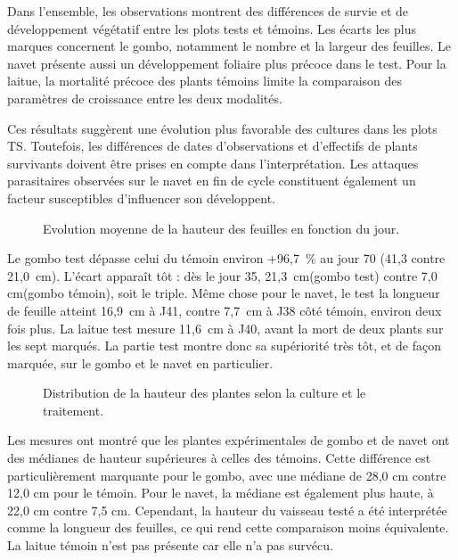 Dans l'ensemble, les observations montrent des différences de survie et de développement végétatif entre les plots tests et témoins. Les écarts les plus marques concernent le gombo, notamment le nombre et la largeur des feuilles. Le navet présente aussi un développement foliaire plus précoce dans le test. Pour la laitue, la mortalité précoce des plants témoins limite la comparaison des paramètres de croissance entre les deux modalités.

Ces résultats suggèrent une évolution plus favorable des cultures dans les plots TS. Toutefois, les différences de dates d'observations et d'effectifs de plants survivants doivent être prises en compte dans l'interprétation. Les attaques parasitaires observées sur le navet en fin de cycle constituent également un facteur susceptibles d'influencer son développent.

\begin{figure}[H]
    \centering
    \caption{Evolution moyenne de la hauteur des feuilles en fonction du jour. }
    \label{fig:hauteur-feuille5}
\end{figure}
Le gombo test dépasse celui du témoin  environ +96,7~\% au jour 70 (41{,}3 contre 21{,}0~cm). L'écart apparaît tôt : dès le jour 35,  21{,}3~cm(gombo test) contre 7{,}0 cm(gombo témoin), soit le triple. Même chose pour le navet, le test la longueur de feuille atteint 16{,}9~cm à J41, contre 7{,}7~cm à J38 côté témoin, environ deux fois plus. La laitue test mesure 11{,}6~cm à J40, avant la mort de deux plants sur les sept marqués. La  partie test montre donc sa supériorité très tôt, et de façon marquée, sur le gombo et le navet en particulier.

\begin{figure}[H]
    \centering
    \caption{Distribution de la hauteur des plantes selon la culture et le traitement. }
    \label{fig:hauteur-boxplot5}
\end{figure}
Les mesures ont montré que les plantes expérimentales de gombo et de navet ont des médianes de hauteur supérieures à celles des témoins. 
Cette différence est particulièrement marquante pour le gombo, avec une médiane de 28,0 cm contre 12,0 cm pour le témoin. 
Pour le navet, la médiane est également plus haute, à 22,0 cm contre 7,5 cm. Cependant, la hauteur du vaisseau testé a été interprétée comme la longueur des feuilles, ce qui rend cette comparaison moins équivalente. La laitue témoin n'est pas présente car elle n'a pas survécu.

